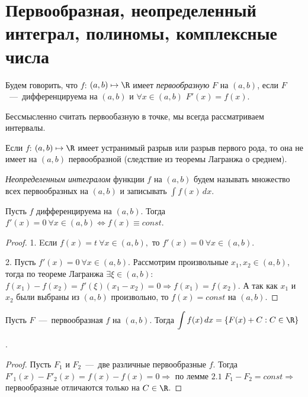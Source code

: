 \section{Первообразная, неопределенный интеграл, полиномы, комплексные числа}
\begin{definition}
	Будем говорить, что $f$: $(a, b) \mapsto \R$ имеет \textit{первообразную} $F$ на $(a, b)$, если $F$~---~дифференцируема на $(a, b)$ и $\forall x \in (a, b)$ $F'(x) = f (x)$.
\end{definition}
\begin{note}
	Бессмысленно считать первообазную в точке, мы всегда рассматриваем интервалы.
\end{note}
\begin{note}
	Если $f$: $(a, b) \mapsto \R$ имеет устранимый разрыв или разрыв первого рода, то она не имеет на $(a, b)$ первообразной (следствие из теоремы Лагранжа о среднем).
\end{note}
\begin{definition}
	\textit{Неопределенным интегралом} функции $f$ на $(a, b)$ будем называть множество всех первообразных на $(a, b)$ и записывать $\displaystyle \int f(x) \,dx$.
\end{definition}
\begin{lemma}
	Пусть $f$ дифференцируема на $(a, b)$. Тогда $f' (x) = 0 \  \forall x \in (a, b) \Leftrightarrow f (x) \equiv const$.
\end{lemma}
\begin{proof}
	1. Eсли $f (x) = t \ \forall x \in (a, b),$ то $f'(x) = 0 \ \forall x \in (a, b).$
	
	2. Пусть $f'(x) = 0 \ \forall x \in (a, b).$ Рассмотрим произвольные $x_{1}, x_{2} \in (a, b)$, тогда по теореме Лагранжа $\exists \xi \in (a, b)$: $f (x_{1}) - f (x_{2}) = f' (\xi) (x_{1} - x_{2}) = 0 \Rightarrow f (x_{1}) = f (x_{2}).$ А так как $x_{1}$ и $x_{2}$ были выбраны из $(a, b)$ произвольно, то $f (x) = const$ на $(a, b)$.
\end{proof}
\begin{corollary}
	\hypertarget{coll6.1}{Пусть $F$~---~первообразная $f$ на $(a, b)$. Тогда $\displaystyle \int f (x) \, dx = \{ F (x) + C: C \in \R \}$}.
\end{corollary}
\begin{proof}
	Пусть $F_{1}$ и $F_{2}$~---~две различные первообразные $f$. Тогда $F'_{1}(x) - F'_{2}(x) = f (x) - f (x) = 0 \Rightarrow$ по лемме $2.1$ $F_{1} - F_{2} = const \Rightarrow$ первообразные отличаются только на $C \in \R$.
\end{proof}